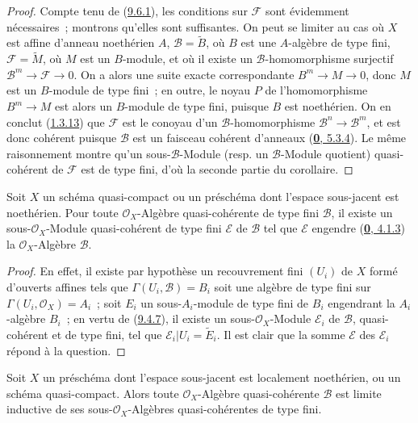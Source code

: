 \begin{proof}
Compte tenu de (\hyperref[I.9.6.1-fr]{9.6.1}), les conditions sur
$\mathscr{F}$ sont évidemment nécessaires~; montrons qu'elles sont
suffisantes. On peut se limiter au cas où $X$ est affine d'anneau
noethérien $A$, $\mathscr{B}=\widetilde{B}$, où $B$ est une $A$-algèbre de
type fini, $\mathscr{F}=\widetilde{M}$, où $M$ est un $B$-module, et où il
existe un $\mathscr{B}$-homomorphisme surjectif
$\mathscr{B}^m\to\mathscr{F}\to 0$. On a alors une suite exacte
correspondante $B^m\to M\to 0$, donc $M$ est un $B$-module de type fini~;
en outre, le noyau $P$ de l'homomorphisme $B^m\to M$ est alors un
$B$-module de type fini, puisque $B$ est noethérien. On en conclut
(\hyperref[I.1.3.13-fr]{1.3.13}) que $\mathscr{F}$ est le conoyau d'un
$\mathscr{B}$-homomorphisme $\mathscr{B}^n\to\mathscr{B}^m$, et est donc
cohérent puisque $\mathscr{B}$ est un faisceau cohérent d'anneaux
(\hyperref[0.5.3.4-fr]{\textbf{0}, 5.3.4}). Le même raisonnement montre qu'un
sous-$\mathscr{B}$-Module (resp. un $\mathscr{B}$-Module quotient)
quasi-cohérent de $\mathscr{F}$ est de type fini, d'où la seconde partie du
corollaire.
\end{proof}

\begin{proposition}[9.6.5]
\label{I.9.6.5-fr}
Soit $X$ un schéma quasi-compact ou un préschéma dont l'espace sous-jacent
est noethérien. Pour toute $\mathscr{O}_X$-Algèbre quasi-cohérente de type
fini $\mathscr{B}$, il existe un sous-$\mathscr{O}_X$-Module quasi-cohérent
de type fini $\mathscr{E}$ de $\mathscr{B}$ tel que $\mathscr{E}$ engendre
\textup{(\hyperref[0.4.1.3-fr]{\textbf{0}, 4.1.3})} la $\mathscr{O}_X$-Algèbre
$\mathscr{B}$.
\end{proposition}

\begin{proof}
En effet, il existe par hypothèse un recouvrement fini $(U_i)$ de $X$ formé
d'ouverts affines tels que $\Gamma(U_i,\mathscr{B})=B_i$ soit une algèbre
de type fini sur $\Gamma(U_i,\mathscr{O}_X)=A_i$~; soit $E_i$ un
sous-$A_i$-module de type fini de $B_i$ engendrant la $A_i$-algèbre $B_i$~;
en vertu de (\hyperref[I.9.4.7-fr]{9.4.7}), il existe un
sous-$\mathscr{O}_X$-Module $\mathscr{E}_i$ de $\mathscr{B}$,
quasi-cohérent et de type fini, tel que
$\mathscr{E}_i|U_i=\widetilde{E}_i$. Il est clair que la somme
$\mathscr{E}$ des $\mathscr{E}_i$ répond à la question.
\end{proof}

\begin{proposition}[9.6.6]
\label{I.9.6.6-fr}
Soit $X$ un préschéma dont l'espace sous-jacent est localement noethérien,
ou un schéma quasi-compact. Alors toute $\mathscr{O}_X$-Algèbre
quasi-cohérente $\mathscr{B}$ est limite inductive de ses
sous-$\mathscr{O}_X$-Algèbres quasi-cohérentes de type fini.
\end{proposition}

